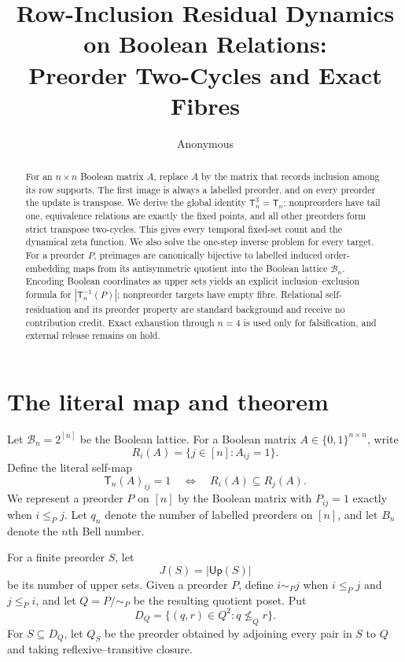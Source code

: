 \documentclass[10pt,a4paper]{amsart}
\title[Row-inclusion residual dynamics]{Row-Inclusion Residual Dynamics on Boolean Relations:\\Preorder Two-Cycles and Exact Fibres}
\author{Anonymous}
\date{}
\theoremstyle{definition}
\theoremstyle{remark}
\newcommand{\B}{\mathcal B}
\newcommand{\Up}{\mathsf{Up}}
\newcommand{\T}{\mathsf T}
\begin{document}
\begin{abstract}
For an $n\times n$ Boolean matrix $A$, replace $A$ by the matrix that records
inclusion among its row supports.  The first image is always a labelled
preorder, and on every preorder the update is transpose.  We derive the
global identity $\T_n^3=\T_n$: nonpreorders have tail one, equivalence
relations are exactly the fixed points, and all other preorders form strict
transpose two-cycles.  This gives every temporal fixed-set count and the
dynamical zeta function.  We also solve the one-step inverse problem for
every target.  For a preorder $P$, preimages are canonically bijective to
labelled induced order-embedding maps from its antisymmetric quotient into
the Boolean lattice $\B_n$.
Encoding Boolean coordinates as upper sets yields an explicit
inclusion--exclusion formula for $|\T_n^{-1}(P)|$; nonpreorder targets have
empty fibre.  Relational self-residuation and its preorder property are
standard background and receive no contribution credit.  Exact exhaustion
through $n=4$ is used only for falsification, and external release remains
on hold.
\end{abstract}

\maketitle
\enlargethispage{2pt}

\section{The literal map and theorem}

Let $\B_n=2^{[n]}$ be the Boolean lattice.  For a Boolean matrix
$A\in\{0,1\}^{n\times n}$, write
\[
 R_i(A)=\{j\in[n]:A_{ij}=1\}.
\]
Define the literal self-map
\begin{equation}\label{eq:map}
 \T_n(A)_{ij}=1
 \quad\Longleftrightarrow\quad
 R_i(A)\subseteq R_j(A).
\end{equation}
We represent a preorder $P$ on $[n]$ by the Boolean matrix with
$P_{ij}=1$ exactly when $i\le_Pj$.  Let $q_n$ denote the number of labelled
preorders on $[n]$, and let $B_n$ denote the $n$th Bell number.

For a finite preorder $S$, let
\[
 J(S)=|\Up(S)|
\]
be its number of upper sets.  Given a preorder $P$, define
$i\sim_Pj$ when $i\le_Pj$ and $j\le_Pi$, and let $Q=P/{\sim_P}$ be the
resulting quotient poset.  Put
\begin{equation}\label{eq:DQ}
 D_Q=\{(q,r)\in Q^2:q\not\le_Qr\}.
\end{equation}
For $S\subseteq D_Q$, let $Q_S$ be the preorder obtained by adjoining every
pair in $S$ to $Q$ and taking reflexive--transitive closure.
\end{document}
